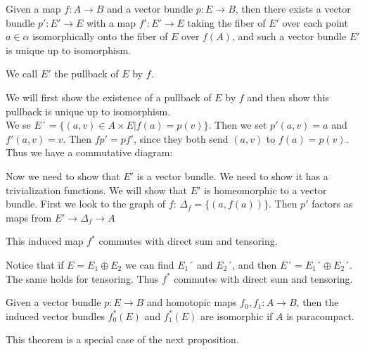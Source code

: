 \documentclass[../Thesis.tex]{subfiles}
\begin{document}
\begin{prop}
Given a map $f: A \rightarrow B$ and a vector bundle $p: E \rightarrow B$, then there exists a vector bundle $p' : E' \rightarrow E$ with a map $f' : E' \rightarrow E$ taking the fiber of $E'$ over each point $a \in \alpha$ isomorphically onto the fiber of $E$ over $f(A)$, and such a vector bundle $E'$ is unique up to isomorphism.
\end{prop}
We call $E'$ the pullback of $E$ by $f$.
\begin{myproof}
We will first show the existence of a pullback of $E$ by $f$ and then show this pullback is unique up to isomorphism.
\\We se $E´ = \{(a,v) \in A \times E | f(a) = p(v) \}$. Then we set $p'(a,v) = a$ and $f'(a,v) = v$. Then $fp'= p f'$, since they both send $(a,v)$ to $f(a) = p(v)$. Thus we have a commutative diagram:
\\
Now we need to show that $E'$ is a vector bundle. We need to show it has a trivialization functions. We will show that $E'$ is homeomorphic to a vector bundle. First we look to the graph of $f$: $\Delta_f = \{ (a, f(a))\}$. Then $p'$ factors as maps from $E'\rightarrow \Delta_f \rightarrow A$
\end{myproof}





\begin{prop}
This induced map $f^*$ commutes with direct sum and tensoring.
\end{prop}

\begin{myproof}
Notice that if $E = E_1 \oplus E_2$ we can find $E_1´ $ and $E_2´$, and then $E´ = E_1´  \oplus E_2´$. The same holds for tensoring. Thus $f^ *$ commutes with direct sum and tensoring.
\end{myproof}




\begin{theorem}
Given a vector bundle $p: E \rightarrow B$ and homotopic maps $f_0, f_1: A \rightarrow B$, then the induced vector bundles $f_0^*(E)$ and $f_1^*(E)$ are isomorphic if $A$ is paracompact.
\end{theorem}
\begin{myproof}
This theorem is a special case of the next proposition.
\end{myproof}
\end{document}
